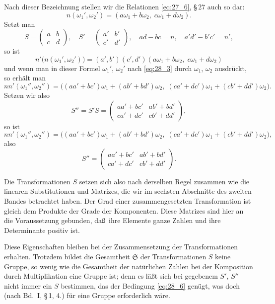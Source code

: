 \documentclass[12pt,a4paper]{article}
\begin{document}
Nach dieser Bezeichnung stellen wir die Relationen \eqref{eq:27_6}, \S\,27 auch so dar:
\begin{equation}\label{eq:28_3}
n(\omega_1',\omega_2') = (a\omega_1+b\omega_2,\; c\omega_1+d\omega_2).
\end{equation}
Setzt man
\[
S = \begin{pmatrix} a & b \\ c & d \end{pmatrix},\quad S' = \begin{pmatrix} a' & b' \\ c' & d' \end{pmatrix},\quad ad-bc=n,\quad a'd'-b'c'=n',
\]
so ist
\[
n'\bigl(n(\omega_1',\omega_2')\bigr) = (a',b')(c',d')(a\omega_1+b\omega_2,\; c\omega_1+d\omega_2)
\]
und wenn man in dieser Formel $\omega_1'$, $\omega_2'$ nach \eqref{eq:28_3} durch $\omega_1$, $\omega_2$ ausdr\"uckt, so erh\"alt man
\begin{equation}\label{eq:28_5}
nn'(\omega_1'',\omega_2'') = \bigl((aa'+bc')\omega_1+(ab'+bd')\omega_2,\; (ca'+dc')\omega_1+(cb'+dd')\omega_2\bigr).
\end{equation}
Setzen wir also
\begin{equation}\label{eq:28_6}
S'' = S'S = \begin{pmatrix} aa'+bc' & ab'+bd' \\ ca'+dc' & cb'+dd' \end{pmatrix},
\end{equation}
so ist
\[
nn'(\omega_1'',\omega_2'') = \bigl((aa'+bc')\omega_1+(ab'+bd')\omega_2,\; (ca'+dc')\omega_1+(cb'+dd')\omega_2\bigr),
\]
also
\[
S'' = \begin{pmatrix} aa'+bc' & ab'+bd' \\ ca'+dc' & cb'+dd' \end{pmatrix}.
\]

\newpage
\noindent
Die Transformationen $S$ setzen sich also nach derselben Regel zusammen wie die linearen Substitutionen und Matrizes, die wir im sechsten Abschnitte des zweiten Bandes betrachtet haben. Der Grad einer zusammengesetzten Transformation ist gleich dem Produkte der Grade der Komponenten. Diese Matrizes sind hier an die Voraussetzung gebunden, da\ss\ ihre Elemente ganze Zahlen und ihre Determinante positiv ist.

Diese Eigenschaften bleiben bei der Zusammensetzung der Transformationen erhalten. Trotzdem bildet die Gesamtheit $\mathfrak{S}$ der Transformationen $S$ keine Gruppe, so wenig wie die Gesamtheit der nat\"urlichen Zahlen bei der Komposition durch Multiplikation eine Gruppe ist; denn es l\"a\ss t sich bei gegebenem $S'$, $S''$ nicht immer ein $S$ bestimmen, das der Bedingung \eqref{eq:28_6} gen\"ugt, was doch (nach Bd.~I, \S\,1, 4.) f\"ur eine Gruppe erforderlich w\"are.
\end{document}
